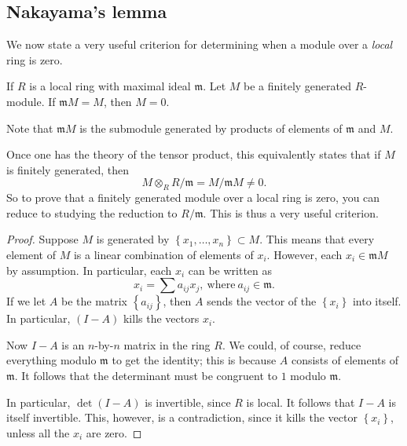 \subsection{Nakayama's lemma}

We now state a very useful criterion for determining when a module over a
\emph{local} ring is zero.


\begin{lemma} \label{nakayama} If $R$ is a local ring with maximal ideal
$\mathfrak{m}$. Let $M$ be a finitely generated $R$-module.  If
$\mathfrak{m}M = M$, then $M = 0$.
\end{lemma}

Note that $\mathfrak{m}M$ is the submodule generated by products of
elements of $\mathfrak{m}$ and $M$.

\begin{remark}
Once one has the theory of the tensor product, this equivalently states that
if $M$ is finitely generated, then
\[ M \otimes_R R/\mathfrak{m} = M/\mathfrak{m}M \neq 0.  \]
So to prove that a finitely generated module over a local ring is zero, you
can reduce to studying the reduction to $R/\mathfrak{m}$. This is thus a very
useful criterion.
\end{remark}


\begin{proof}
Suppose $M$ is generated by $\left\{x_1, \dots, x_n\right\} \subset M$. This
means that every element of $M$ is  a linear combination of elements of
$x_i$. However, each $x_i \in \mathfrak{m}M$ by assumption. In particular, each
$x_i$ can be written as
\[ x_i = \sum a_{ij} x_j, \ \mathrm{where} \ a_{ij} \in \mathfrak{m}.  \]
If we let $A$ be the matrix $\left\{a_{ij}\right\}$, then $A$ sends the
vector of the $\left\{x_i\right\}$ into itself. In particular, $(I-A)$ kills
the vectors $x_i$.

Now $I-A$ is an $n$-by-$n$ matrix in the ring $R$. We could, of course,
reduce everything modulo $\mathfrak{m}$ to get the identity; this is
because $A$ consists of elements of $\mathfrak{m}$. It follows that the
determinant must be congruent to $1$ modulo $\mathfrak{m}$.

In particular, $\det (I - A)$ is invertible, since $R$ is local.  It
follows that $I-A$ is itself invertible. This, however, is  a
contradiction, since it kills the vector $\left\{x_i\right\}$, unless all the
$x_i $ are zero.
\end{proof}

